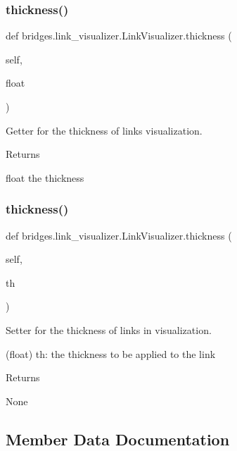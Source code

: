 \subsubsection{\texorpdfstring{thickness()}{thickness()}\hspace{0.1cm}{\footnotesize\ttfamily [1/2]}}
{\footnotesize\ttfamily def bridges.\+link\+\_\+visualizer.\+Link\+Visualizer.\+thickness (\begin{DoxyParamCaption}\item[{}]{self,  }\item[{}]{float }\end{DoxyParamCaption})}



Getter for the thickness of links visualization. 

\begin{DoxyReturn}{Returns}


float the thickness 
\end{DoxyReturn}
\mbox{\label{classbridges_1_1link__visualizer_1_1_link_visualizer_af244bbe99885785f7dd3bb9460c1d21a}} 
\subsubsection{\texorpdfstring{thickness()}{thickness()}\hspace{0.1cm}{\footnotesize\ttfamily [2/2]}}
{\footnotesize\ttfamily def bridges.\+link\+\_\+visualizer.\+Link\+Visualizer.\+thickness (\begin{DoxyParamCaption}\item[{}]{self,  }\item[{}]{th }\end{DoxyParamCaption})}



Setter for the thickness of links in visualization. 

(float) th\+: the thickness to be applied to the link \begin{DoxyReturn}{Returns}


None 
\end{DoxyReturn}


\subsection{Member Data Documentation}
\mbox{\label{classbridges_1_1link__visualizer_1_1_link_visualizer_aace0e171fe2904f672b8ed3e0139343f}} 
